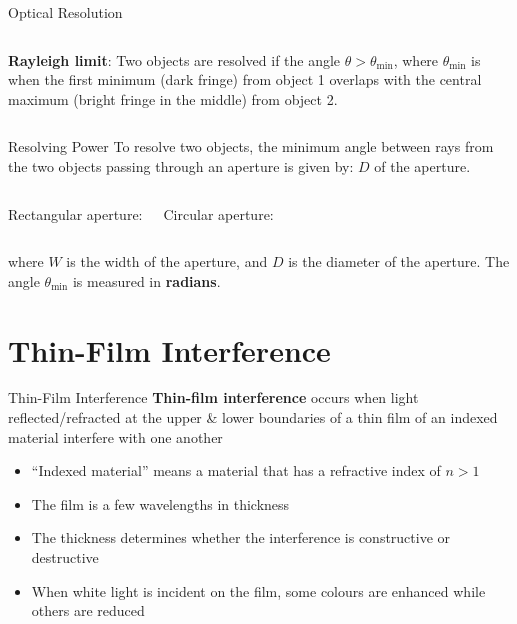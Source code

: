 \documentclass[12pt,compress,aspectratio=169]{beamer}
\begin{document}
\begin{frame}{Optical Resolution}
  \begin{columns}

    \textbf{Rayleigh limit}: Two objects are resolved if the angle
      $\theta>\theta_\text{min}$, where $\theta_\text{min}$ is when the first
      minimum (dark fringe) from object 1 overlaps with the central maximum
      (bright fringe in the middle) from object 2.
  \end{columns}
\end{frame}


\begin{frame}{Resolving Power}
  To resolve two objects, the minimum angle between rays from the two objects
  passing through an aperture is given by:
  $D$ of the aperture.
  \vspace{0.2in}
  \begin{columns}
    Rectangular aperture:

    Circular aperture:

  \end{columns}
  where $W$ is the width of the aperture, and $D$ is the diameter of the
  aperture. The angle $\theta_\text{min}$ is measured in \textbf{radians}.
\end{frame}


\section{Thin-Film Interference}

\begin{frame}{Thin-Film Interference}
  \textbf{Thin-film interference} occurs when light reflected/refracted at
  the upper \& lower boundaries of a thin film of an indexed material interfere
  with one another
  \begin{itemize}
  \item ``Indexed material'' means a material that has a refractive index of
    $n>1$
  \item The film is a few wavelengths in thickness
  \item The thickness determines whether the interference is constructive or
    destructive
  \item When white light is incident on the film, some colours are enhanced
    while others are reduced
  \end{itemize}
\end{frame}
\end{document}
